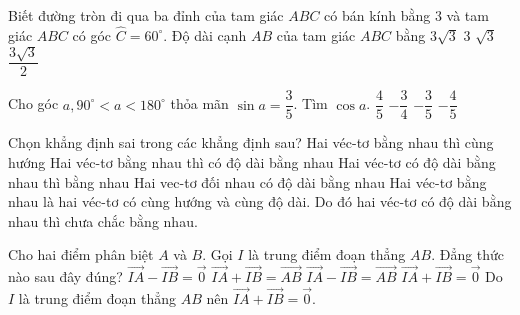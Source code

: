 \begin{ex}%
Biết đường tròn đi qua ba đỉnh của tam giác $A B C$ có bán kính bằng $3$ và tam giác $A B C$ có góc $\widehat{C}=60^{\circ}$. Độ dài cạnh $A B$ của tam giác $A B C$ bằng
\choice
{\True $3 \sqrt{3}$}
{$3$}
{$\sqrt{3}$}
{$\dfrac{3 \sqrt{3}}{2}$}
\end{ex}

\begin{ex}%
Cho góc $a, 90^{\circ} < a < 180^{\circ}$ thỏa mãn $\sin a=\dfrac{3}{5}$. Tìm $\cos a$.
\choice
{$\dfrac{4}{5}$}
{$-\dfrac{3}{4}$}
{$-\dfrac{3}{5}$}
{\True $-\dfrac{4}{5}$}
\end{ex}

\begin{ex}%
Chọn khẳng định sai trong các khẳng định sau?
\choice
{ Hai véc-tơ bằng nhau thì cùng hướng}
{Hai véc-tơ bằng nhau thì có độ dài bằng nhau}
{\True Hai véc-tơ có độ dài bằng nhau thì bằng nhau}
{Hai vec-tơ đối nhau có độ dài bằng nhau}
\loigiai
{ Hai véc-tơ bằng nhau là hai véc-tơ có cùng hướng và cùng độ dài. Do đó hai véc-tơ có độ dài bằng nhau thì chưa chắc bằng nhau.}
\end{ex}

\begin{ex}%
Cho hai điểm phân biệt $A$ và $B$. Gọi $I$ là trung điểm đoạn thẳng $AB$. Đẳng thức nào sau đây đúng?
\choice
{$\overrightarrow{IA}-\overrightarrow{IB}=\overrightarrow{0}$}
{$\overrightarrow{IA}+\overrightarrow{IB}=\overrightarrow{AB}$}
{$\overrightarrow{IA}-\overrightarrow{IB}=\overrightarrow{AB}$}
{\True $\overrightarrow{IA}+\overrightarrow{IB}=\overrightarrow{0}$}
\loigiai
{
Do  $I$ là trung điểm đoạn thẳng $AB$ nên $\overrightarrow{IA}+\overrightarrow{IB}=\overrightarrow{0}$.
}
\end{ex}

